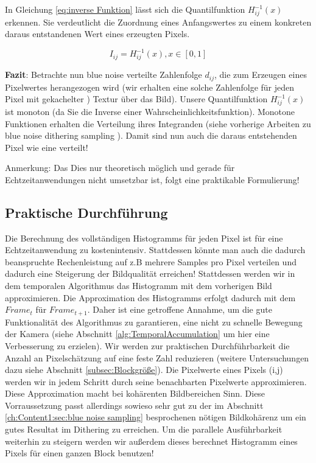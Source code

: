In Gleichung \ref{eq:inverse Funktion} lässt sich die Quantilfunktion $H_{ij}^{-1}(x)$ erkennen. 
Sie verdeutlicht die Zuordnung eines Anfangswertes zu einem konkreten daraus entstandenen Wert 
eines erzeugten Pixels.

\begin{equation}\label{eq:inverse Funktion}
    I_{ij} = H_{ij}^{-1}(x), x \in [0,1]
\end{equation}

\par

\textbf{Fazit}: Betrachte nun blue noise verteilte Zahlenfolge $d_{ij}$, die zum Erzeugen eines Pixelwertes herangezogen wird (wir erhalten eine solche 
Zahlenfolge für jeden Pixel mit gekachelter ) Textur über das Bild). Unsere Quantilfunktion 
$H_{ij}^{-1}(x)$ ist monoton (da Sie die Inverse einer Wahrscheinlichkeitsfunktion). Monotone Funktionen erhalten die Verteilung ihres
Integranden (siehe vorherige Arbeiten zu \glqq blue noise dithering sampling\grqq{} \cite[Seite 3]{hal02158423} \cite{georgiev2016blue}). 
Damit sind nun auch die daraus entstehenden Pixel wie eine  verteilt! 

Anmerkung: Das Dies nur theoretisch möglich und gerade für Echtzeitanwendungen nicht umsetzbar ist, 
folgt eine praktikable Formulierung!

\label{subsec:Praktische_Durchführung}
\subsection{Praktische Durchführung}

Die Berechnung des vollständigen Histogramms für jeden Pixel ist für eine Echtzeitanwendung zu kostenintensiv. Stattdessen könnte man auch die dadurch beanspruchte 
Rechenleistung auf z.B mehrere Samples pro Pixel verteilen und dadurch eine Steigerung der Bildqualität erreichen!
Stattdessen werden wir in dem temporalen Algorithmus das Histogramm mit dem vorherigen Bild approximieren. 
Die Approximation des Histogramms erfolgt dadurch mit dem $Frame_{t}$ für $Frame_{t+1}$. Daher ist eine getroffene Annahme, um die gute Funktionalität des 
Algorithmus zu garantieren, eine nicht zu schnelle Bewegung der Kamera (siehe Abschnitt \ref{alg:TemporalAccumulation} um hier eine Verbesserung zu erzielen).
Wir werden zur praktischen Durchführbarkeit die Anzahl an Pixelschätzung auf eine feste Zahl reduzieren (weitere Untersuchungen dazu siehe Abschnitt \ref{subsec:Blockgröße}).
Die Pixelwerte eines Pixels (i,j) werden wir in jedem Schritt durch seine benachbarten Pixelwerte approximieren. Diese Approximation macht bei kohärenten 
Bildbereichen Sinn. Diese Vorraussetzung passt allerdings sowieso sehr gut zu der im Abschnitt \ref{ch:Content1:sec:blue noise sampling} besprochenen nötigen 
Bildkohärenz um ein gutes Resultat im Dithering zu erreichen. Um die parallele Ausführbarkeit weiterhin zu steigern werden wir außerdem dieses 
berechnet Histogramm eines Pixels für einen ganzen Block benutzen!
\par

